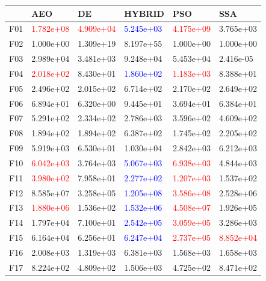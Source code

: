 \documentclass{article}
\begin{document}
\begin{table}[H]
	\centering
\begin{tabular}{|l|lllll|}
	\hline
	{} &        AEO &         DE &     HYBRID &        PSO &        SSA \\
	\hline
	F01  &  \textcolor{red}{1.782e+08} &  \textcolor{red}{4.909e+04} &  \textcolor{blue}{5.245e+03} &  \textcolor{red}{4.175e+09} &  {3.765e+03} \\
	F02  &  1.000e+00 &  1.309e+19 &  8.197e+55 &  1.000e+00 &  1.000e+00 \\
	F03  &  2.989e+04 &  3.481e+03 &  9.248e+04 &  5.453e+04 &  2.416e-05 \\
	F04  &  \textcolor{red}{2.018e+02} &  8.430e+01 &  \textcolor{blue}{1.860e+02} &  \textcolor{red}{1.183e+03} &  8.388e+01 \\
	F05  &  2.496e+02 &  2.015e+02 &  6.714e+02 &  2.170e+02 &  2.649e+02 \\
	F06  &  6.894e+01 &  6.320e+00 &  9.445e+01 &  3.694e+01 &  6.384e+01 \\
	F07  &  5.291e+02 &  2.334e+02 &  2.786e+03 &  3.596e+02 &  4.609e+02 \\
	F08  &  1.894e+02 &  1.894e+02 &  6.387e+02 &  1.745e+02 &  2.205e+02 \\
	F09  &  5.919e+03 &  6.530e+01 &  1.030e+04 &  2.842e+03 &  6.212e+03 \\
	F10  &  \textcolor{red}{6.042e+03} &  3.764e+03 &  \textcolor{blue}{5.067e+03} &  \textcolor{red}{6.938e+03} &  4.844e+03 \\
	F11  &  \textcolor{red}{3.980e+02} &  7.958e+01 &  \textcolor{blue}{2.277e+02} &  \textcolor{red}{1.207e+03} &  1.537e+02 \\
	F12  &  8.585e+07 &  3.258e+05 &  \textcolor{blue}{1.205e+08} &  \textcolor{red}{3.586e+08} &  2.528e+06 \\
	F13  &  \textcolor{red}{1.880e+06} &  1.536e+02 &  \textcolor{blue}{1.532e+06} &  \textcolor{red}{4.508e+07} &  1.926e+05 \\
	F14  &  1.797e+04 &  7.100e+01 &  \textcolor{blue}{2.542e+05} &  \textcolor{red}{3.059e+05} &  3.286e+03 \\
	F15  &  6.164e+04 &  6.256e+01 &  \textcolor{blue}{6.247e+04} &  \textcolor{red}{2.737e+05} &  \textcolor{red}{8.852e+04} \\
	F16  &  2.008e+03 &  1.319e+03 &  6.381e+03 &  1.568e+03 &  1.658e+03 \\
	F17  &  8.224e+02 &  4.809e+02 &  1.506e+03 &  4.725e+02 &  8.471e+02 \\

\end{tabular}
\end{table}
\end{document}
